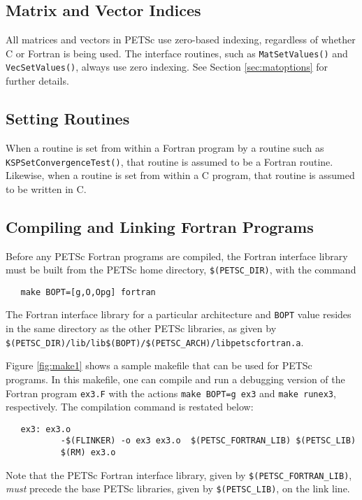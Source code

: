 \subsection{Matrix and Vector Indices}

All matrices and vectors in PETSc use zero-based indexing, regardless
of whether C or Fortran is being used.  The interface routines, such
as {\tt MatSetValues()} and {\tt VecSetValues()}, always use zero
indexing.  See Section \ref{sec:matoptions} for further details.

\subsection{Setting Routines}

When a routine is set from within a Fortran program by a routine such
as {\tt KSPSetConvergenceTest()}, that routine is assumed to be a
Fortran routine. Likewise, when a routine is set from within a C
program, that routine is assumed to be written in C.

\subsection{Compiling and Linking Fortran Programs}
\label{sec:fortcompile}

Before any PETSc Fortran programs are compiled, the Fortran interface
library must be built from the PETSc home directory, {\tt \$(PETSC\_DIR)},
with the command
\begin{verbatim}
   make BOPT=[g,O,Opg] fortran
\end{verbatim}
The Fortran interface library  for a particular architecture and {\tt BOPT} value
resides in the same directory as the other PETSc libraries, as given by
{\tt \$(PETSC\_DIR)/lib/lib\$(BOPT)/\$(PETSC\_ARCH)/libpetscfortran.a}.

Figure \ref{fig:make1} shows a sample makefile that can be used for
PETSc programs.  In this makefile, one can compile and run a debugging version
of the Fortran program {\tt ex3.F} with the actions {\tt make BOPT=g ex3} and
{\tt make runex3}, respectively. The compilation command is restated below:
\begin{verbatim}
   ex3: ex3.o 
           -$(FLINKER) -o ex3 ex3.o  $(PETSC_FORTRAN_LIB) $(PETSC_LIB)
           $(RM) ex3.o
\end{verbatim}
Note that the PETSc Fortran interface library, given by 
{\tt \$(PETSC\_FORTRAN\_LIB)}, {\em must}   precede
the base PETSc libraries, given by {\tt \$(PETSC\_LIB)}, 
on the link line.

